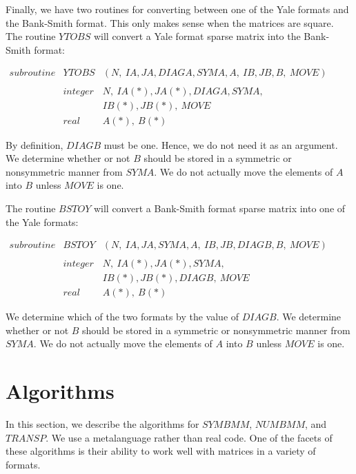 Finally, we have two routines for converting between one of the Yale formats
and the Bank-Smith format.  This only makes sense when the matrices are
square.  The routine $YTOBS$ will convert a Yale format sparse matrix into the
Bank-Smith format:
\begin{center}
$\begin{array}{lll}
subroutine & YTOBS   & (N,\ IA,JA,DIAGA,SYMA,A,\ IB,JB,B,\ MOVE)\\
           &         & \\
           & integer & N,\ IA(*),JA(*),DIAGA,SYMA,\\
           &         & IB(*),JB(*),\ MOVE\\
           & real    & A(*),\ B(*)
\end{array}$
\end{center}
By definition, $DIAGB$ must be one.  Hence, we do not need it as an argument.
We determine whether or not $B$ should be stored in a symmetric or
nonsymmetric manner from $SYMA$.  We do not actually move the elements of $A$
into $B$ unless $MOVE$ is one.
 
The routine $BSTOY$ will convert a Bank-Smith format sparse matrix into one of
the Yale formats:
\begin{center}
$\begin{array}{lll}
subroutine & BSTOY   & (N,\ IA,JA,SYMA,A,\ IB,JB,DIAGB,B,\ MOVE)\\
           &         & \\
           & integer & N,\ IA(*),JA(*),SYMA,\\
           &         & IB(*),JB(*),DIAGB,\ MOVE\\
           & real    & A(*),\ B(*)
\end{array}$
\end{center}
We determine which of the two formats by the value of $DIAGB$.  We determine
whether or not $B$ should be stored in a symmetric or nonsymmetric manner from
$SYMA$.  We do not actually move the elements of $A$ into $B$ unless $MOVE$ is
one.

 
\section{Algorithms}
\label{Sec:Algorithms}
 
In this section, we describe the algorithms for $SYMBMM$, $NUMBMM$,
and $TRANSP$.  We use a metalanguage rather than real code.  One of
the facets of these algorithms is their ability to work well with
matrices in a variety of formats.
 
